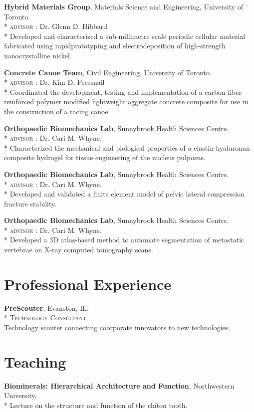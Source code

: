 \textbf{Hybrid Materials Group}, Materials Science and Engineering, University of Toronto.\\*
\textsc{advisor} : Dr. Glenn D. Hibbard\\*
Developed and characterized a sub-millimetre scale periodic cellular material fabricated using rapidprototyping and electrodeposition of high-strength nanocrystalline nickel.

\textbf{Concrete Canoe Team}, Civil Engineering, University of Toronto.\\*
\textsc{advisor} : Dr. Kim D. Pressnail\\*
Coordinated the development, testing and implementation of a carbon fiber reinforced polymer modified lightweight aggregate concrete composite for use in the construction of a racing canoe.

\textbf{Orthopaedic Biomechanics Lab}, Sunnybrook Health Sciences Centre.\\*
\textsc{advisor} : Dr. Cari M. Whyne.\\*
Characterized the mechanical and biological properties of a elastin-hyaluronan composite hydrogel for tissue engineering of the nucleus pulposus.

\textbf{Orthopaedic Biomechanics Lab}, Sunnybrook Health Sciences Centre.\\*
\textsc{advisor} : Dr. Cari M. Whyne.\\*
Developed and validated a finite element model of pelvic lateral compression fracture stability.

\textbf{Orthopaedic Biomechanics Lab}, Sunnybrook Health Sciences Centre.\\*
\textsc{advisor} : Dr. Cari M. Whyne.\\*
Developed a 3D atlas-based method to automate segmentation of metastatic vertebrae on X-ray computed tomography scans.
\endgroup

\section*{Professional Experience}
\textbf{PreScouter}, Evanston, IL.\\*
\begingroup\setlength{\parskip}{0.2cm}
\textsc{Technology Consultant}\\
Technology scouter connecting coorporate innovators to new technologies.  

\section*{Teaching}
\textbf{Biominerals: Hierarchical Architecture and Function}, Northwestern University.\\*
\begingroup\setlength{\parskip}{0.1cm}
Lecture on the structure and function of the chiton tooth.

